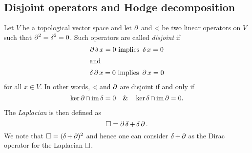 \subsection{Disjoint operators and Hodge decomposition}

Let $V$ be a topological vector space and let $\lcd$ and $\lhd$ be two linear operators on $V$ such that $\lcd^2 = \lhd^2 = 0$. Such operators are called \emph{disjoint} if
\begin{gather*}
 \lcd\lhd x= 0 \text{ implies } \lhd x =0 \\
 \intertext{and}
 \lhd \lcd x = 0 \text{ implies } \lcd x = 0
\end{gather*}
for all $x\in V$. In other words, $\lhd$ and $\lcd$ are disjoint if and only if
\begin{equation}\label{eq:disjointness}
 \ker \lcd \cap \im \lhd = 0 \quad \& \quad \ker \lhd \cap \im \lcd = 0.
\end{equation}


The \emph{Laplacian} is then defined as
\[\lap = \lcd \lhd + \lhd \lcd.\] We note that $\lap  = (\lhd + \lcd)^2$ and hence one can consider $\lhd + \lcd$ as the Dirac operator for the Laplacian $\lap$. %

